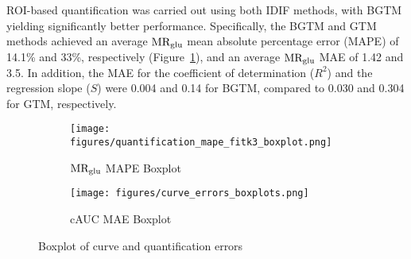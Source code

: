ROI-based quantification was carried out using both IDIF methods, with BGTM yielding significantly better performance.
Specifically, the BGTM and GTM methods achieved an average \(\text{MR}_{\text{glu}}\) mean absolute percentage error (MAPE) of 14.1\% and 33\%, respectively (Figure~\ref{subfig:mape_boxplot}), and an average \(\text{MR}_{\text{glu}}\) MAE of 1.42 and 3.5.
In addition, the MAE for the coefficient of determination (\(R^2\)) and the regression slope (\(S\)) were 0.004 and 0.14 for BGTM, compared to 0.030 and 0.304 for GTM, respectively.

\begin{figure}
	\centering
	\begin{subfigure}[b]{0.45\textwidth}
		\texttt{[image: figures/quantification\_mape\_fitk3\_boxplot.png]}
		\caption{\(\text{MR}_{\text{glu}}\) MAPE Boxplot}
		\label{subfig:mape_boxplot}
	\end{subfigure}
	\begin{subfigure}[b]{0.45\textwidth}
		\texttt{[image: figures/curve\_errors\_boxplots.png]}
		\caption{cAUC MAE Boxplot}
		\label{subfig:cauc_boxplot}
	\end{subfigure}
	\caption{Boxplot of curve and quantification errors}
	\label{fig:boxplots}
\end{figure}

